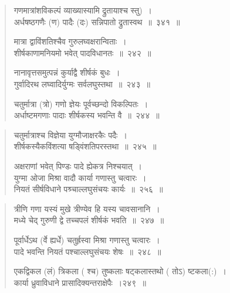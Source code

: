 \documentclass[11pt, openany]{book}
\begin{document}

\newpage

\begin{quote}
{\na गणमात्रांशविकल्पं व्याख्यास्यामि द्रुतायाश्च स्तु)~। \\
अर्धषष्ठगणैः (ण) पादैः (दः) सन्निपातो द्रुतास्वथ~॥~३४१~॥

मात्रा द्वाविंशतिश्चैव गुरुलघ्वक्षरान्विताः~। \\
शीर्षकाणामनियमो भवेत् पादविधानतः~॥~२४२~॥

नानावृत्तसमुत्पन्नं कुर्याद्वै शीर्षकं बुधः~। \\
गुर्वादिरथ लघ्वादिर्युग्मः सर्वलघुस्तथा~॥~२४३~॥

चतुर्मात्रा (त्रो) गणो ज्ञेयः पूर्वच्छन्दो विकल्पितः~।\\
अर्धाष्टमगणाः पादाः शीर्षकस्य भवन्ति वै~॥~२४४~॥}
\end{quote}


\newpage

\begin{quote}
{\na चतुर्मात्राश्च विज्ञेया युग्मौजाक्षरकैः पदैः~।\\
शीर्षकस्यैकविंशत्या षड्विंशतिपरस्तथा~॥~२४५~॥

अक्षराणां भवेत् पिण्डः पादे ह्येकत्र निश्चयात्~।\\
युग्मा ओजा मिश्रा वादौ कार्या गणास्तु चत्वारः~।\\
नियतं सीर्षविधाने पश्र्चाल्लघुसंचयः कार्यः~॥~२५६~॥}
\end{quote}


\newpage

\begin{quote}
{\na त्रीणि गणा यस्यं मुखे त्रीण्येव हि यस्य चावसानानि~। \\
मध्ये चेद् गुरुणी द्वे तच्चपलं शीर्षकं भवति~॥~२४७~॥

पूर्वार्धेऽथ (र्वे ह्यर्धे) चतुर्ह्रस्वा मिश्रा गणास्तु चत्वारः~।\\
पादे भवन्ति नियतं पश्चाल्लघुसंचयः शेषः~॥~२४८~॥

एकद्विकल (लं) त्रिकला ( श्च) तुष्कलाः षट्कलास्तथो ( तोऽ) ष्टकला(:)~। \\
कार्या ध्रुवाविधाने प्रासादिक्यन्तराक्षेपैः~।२४९~॥}
\end{quote}

\end{document}
